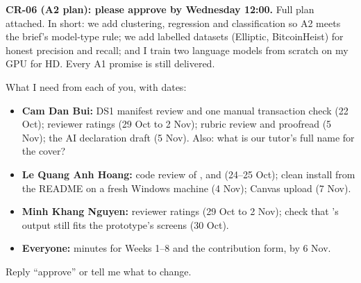 \begin{summarybox}
\small
\textbf{CR-06 (A2 plan): please approve by Wednesday 12:00.} Full plan attached. In short: we add
clustering, regression and classification so A2 meets the brief's model-type rule; we add
labelled datasets (Elliptic, BitcoinHeist) for honest precision and recall; and I train two
language models from scratch on my GPU for HD. Every A1 promise is still delivered.

What I need from each of you, with dates:
\begin{itemize}[leftmargin=*]
  \item \textbf{Cam Dan Bui:} DS1 manifest review and one manual transaction check (22 Oct);
    reviewer ratings (29 Oct to 2 Nov); rubric review and proofread (5 Nov); the AI declaration
    draft (5 Nov). Also: what is our tutor's full name for the cover?
  \item \textbf{Le Quang Anh Hoang:} code review of ,  and
     (24--25 Oct); clean install from the README on a fresh Windows machine
    (4 Nov); Canvas upload (7 Nov).
  \item \textbf{Minh Khang Nguyen:} reviewer ratings (29 Oct to 2 Nov); check that
    's output still fits the prototype's screens (30 Oct).
  \item \textbf{Everyone:} minutes for Weeks 1--8 and the contribution form, by 6 Nov.
\end{itemize}
Reply ``approve'' or tell me what to change.
\end{summarybox}
